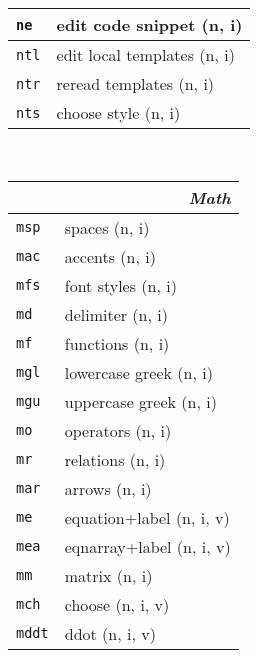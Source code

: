 \documentclass[oneside,10pt,landscape,DIV17]{scrartcl}
\newcommand{\Map}[1] {\textbf{\textasciiacute}\texttt{#1}}
\begin{document}
\begin{multicols}{3}
\begin{center}
\begin{tabular}[]{|p{11mm}|p{60mm}|}
\hline \Map{ne}  & edit code snippet         \hfill (n, i)   \\
\hline
\hline \Map{ntl} & edit local templates      \hfill (n, i)   \\
\hline \Map{ntr} & reread templates          \hfill (n, i)   \\
\hline \Map{nts} & choose style              \hfill (n, i)   \\
\hline
%
\end{tabular}\\
%
\begin{tabular}[]{|p{11mm}|p{62mm}|}
\hline
\multicolumn{2}{|r|}{\textsl{\textbf{M}ath}}  \\[1.0ex]
\hline  \Map{msp} & spaces                    \hfill (n, i)\\
\hline  \Map{mac} & accents                   \hfill (n, i)\\
\hline  \Map{mfs} & font styles               \hfill (n, i)\\
\hline  \Map{md}  & delimiter                 \hfill (n, i)\\
\hline  \Map{mf}  & functions                 \hfill (n, i)\\
\hline  \Map{mgl} & lowercase  greek          \hfill (n, i)\\
\hline  \Map{mgu} & uppercase greek           \hfill (n, i)\\
\hline  \Map{mo}  & operators                 \hfill (n, i)\\
\hline  \Map{mr}  & relations                 \hfill (n, i)\\
\hline  \Map{mar} & arrows                    \hfill (n, i)\\
\hline
\hline  \Map{me}  & equation+label            \hfill (n, i, v)\\
\hline  \Map{mea} & eqnarray+label            \hfill (n, i, v)\\
\hline  \Map{mm}  & matrix                    \hfill (n, i)\\
\hline
\hline  \Map{mch} & choose                    \hfill (n, i, v)\\
\hline  \Map{mddt}& ddot                      \hfill (n, i, v)\\

\end{tabular}
\end{center}
\end{multicols}
\end{document}
